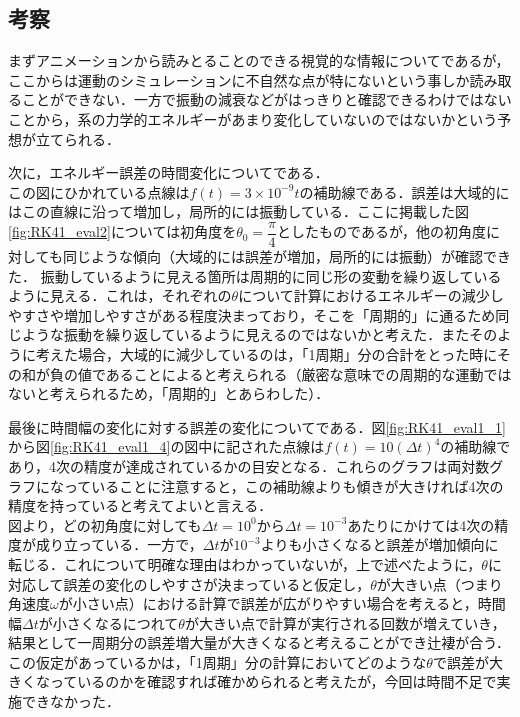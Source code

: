 \documentclass[a4paper,11pt]{jsarticle}
\begin{document}
\subsection{考察}
まずアニメーションから読みとることのできる視覚的な情報についてであるが，ここからは運動のシミュレーションに不自然な点が特にないという事しか読み取ることができない．一方で振動の減衰などがはっきりと確認できるわけではないことから，系の力学的エネルギーがあまり変化していないのではないかという予想が立てられる．\par
次に，エネルギー誤差の時間変化についてである．\\
この図にひかれている点線は\(f(t) = 3\times10^{-9}t\)の補助線である．誤差は大域的にはこの直線に沿って増加し，局所的には振動している．ここに掲載した図\ref{fig:RK41_eval2}については初角度を\(\theta_0 = \dfrac{\pi}{4}\)としたものであるが，他の初角度に対しても同じような傾向（大域的には誤差が増加，局所的には振動）が確認できた．
振動しているように見える箇所は周期的に同じ形の変動を繰り返しているように見える．これは，それぞれの\(\theta\)について計算におけるエネルギーの減少しやすさや増加しやすさがある程度決まっており，そこを「周期的」に通るため同じような振動を繰り返しているように見えるのではないかと考えた．またそのように考えた場合，大域的に減少しているのは，「1周期」分の合計をとった時にその和が負の値であることによると考えられる（厳密な意味での周期的な運動ではないと考えられるため，「周期的」とあらわした）．\par
最後に時間幅の変化に対する誤差の変化についてである．図\ref{fig:RK41_eval1_1}から図\ref{fig:RK41_eval1_4}の図中に記された点線は\(f(t) = 10(\Delta t)^{4}\)の補助線であり，4次の精度が達成されているかの目安となる．これらのグラフは両対数グラフになっていることに注意すると，この補助線よりも傾きが大きければ4次の精度を持っていると考えてよいと言える．\\
図より，どの初角度に対しても\(\Delta t = 10^0\)から\(\Delta t = 10^{-3}\)あたりにかけては4次の精度が成り立っている．一方で，\(\Delta t\)が\(10^{-3}\)よりも小さくなると誤差が増加傾向に転じる．これについて明確な理由はわかっていないが，上で述べたように，\(\theta\)に対応して誤差の変化のしやすさが決まっていると仮定し，\(\theta\)が大きい点（つまり角速度\(\omega\)が小さい点）における計算で誤差が広がりやすい場合を考えると，時間幅\(\Delta t\)が小さくなるにつれて\(\theta\)が大きい点で計算が実行される回数が増えていき，結果として一周期分の誤差増大量が大きくなると考えることができ辻褄が合う．\\
この仮定があっているかは，「1周期」分の計算においてどのような\(\theta\)で誤差が大きくなっているのかを確認すれば確かめられると考えたが，今回は時間不足で実施できなかった．
\end{document}
